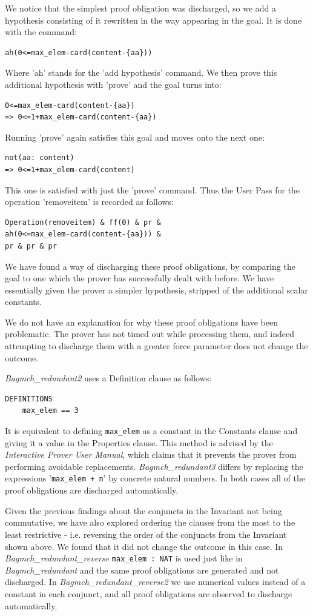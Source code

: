 \documentclass[11pt,journal]{IEEEtran}
\begin{document}
	We notice that the simplest proof obligation was discharged, so we add a hypothesis consisting of it rewritten in the way appearing in the goal. It is done with the command:
	\begin{lstlisting}
ah(0<=max_elem-card(content-{aa}))
	\end{lstlisting}
	Where 'ah' stands for the 'add hypothesis' command. We then prove this additional hypothesis with 'prove' and the goal turns into:
	\begin{lstlisting}
0<=max_elem-card(content-{aa}) 
=> 0<=1+max_elem-card(content-{aa}) 
	\end{lstlisting}
	Running 'prove' again satisfies this goal and moves onto the next one: 
	\begin{lstlisting}
not(aa: content) 
=> 0<=1+max_elem-card(content)
	\end{lstlisting}
	This one is satisfied with just the 'prove' command. Thus the User Pass for the operation 'removeitem' is recorded as follows:
	\begin{lstlisting}
Operation(removeitem) & ff(0) & pr & 
ah(0<=max_elem-card(content-{aa})) & 
pr & pr & pr
	\end{lstlisting}
	We have found a way of discharging these proof obligations, by comparing the goal to one which the prover has successfully dealt with before. We have essentially given the prover a simpler hypothesis, stripped of the additional scalar constants.
	
	We do not have an explanation for why these proof obligations have been problematic. The prover has not timed out while processing them, and indeed attempting to discharge them with a greater force parameter does not change the outcome.
	
	\emph{Bagmch\_redundant2} uses a Definition clause as follows:
	\begin{lstlisting}
DEFINITIONS
	max_elem == 3
	\end{lstlisting}
	It is equivalent to defining \texttt{max\_elem} as a constant in the Constants clause and giving it a value in the Properties clause. This method is advised by the \emph{Interactive Prover User Manual}\cite{Prover guide}, which claims that it prevents the prover from performing avoidable replacements. \emph{Bagmch\_redundant3} differs by replacing the expressions '\texttt{max\_elem + n}' by concrete natural numbers. In both cases all of the proof obligations are discharged automatically.
	
	Given the previous findings about the conjuncts in the Invariant not being commutative, we have also explored ordering the clauses from the most to the least restrictive - i.e. reversing the order of the conjuncts from the Invariant shown above. We found that it did not change the outcome in this case. In \emph{Bagmch\_redundant\_reverse} \texttt{max\_elem : NAT} is used just like in \emph{Bagmch\_redundant} and the same proof obligations are generated and not discharged. In \emph{Bagmch\_redundant\_reverse2} we use numerical values instead of a constant in each conjunct, and all proof obligations are observed to discharge automatically.
	
\end{document}

